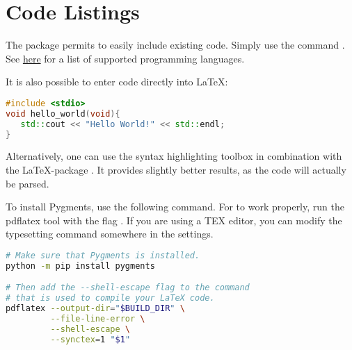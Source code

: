 

\chapter{Code Listings}

\label{Chapter7} %


The package \href{https://www.overleaf.com/learn/latex/Code\_listing}{} permits to easily include existing code. Simply use the command \verb||. See \href{https://www.overleaf.com/learn/latex/Code\_listing#Supported\_languages}{here} for a list of supported programming languages.




It is also possible to enter code directly into \LaTeX:

\begin{lstlisting}[language=C++]
#include <stdio>
void hello_world(void){
   std::cout << "Hello World!" << std::endl;
}    
\end{lstlisting}

Alternatively, one can use the syntax highlighting toolbox \href{https://pygments.org/}{} in combination with the \LaTeX-package \href{www.overleaf.com/learn/latex/Code\_Highlighting\_with\_minted}{}. It provides slightly better results, as the code will actually be parsed.

To install Pygments, use the following command. For  to work properly, run the pdflatex tool with the flag . If you are using a TEX editor, you can modify the typesetting   command somewhere in the settings.

\begin{lstlisting}[language=bash]
# Make sure that Pygments is installed.
python -m pip install pygments

# Then add the --shell-escape flag to the command 
# that is used to compile your LaTeX code.
pdflatex --output-dir="$BUILD_DIR" \
         --file-line-error \
         --shell-escape \
         --synctex=1 "$1"
\end{lstlisting}



